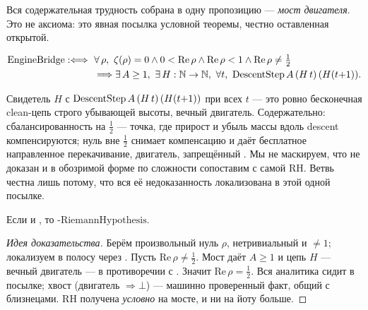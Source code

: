 Вся содержательная трудность собрана в одну пропозицию --- \emph{мост двигателя}. Это не аксиома: это
явная посылка условной теоремы, честно оставленная открытой.

\begin{definition}\label{def:EngineBridge}
\begin{equation}\label{eq:EngineBridge}
\begin{aligned}
  \mathrm{EngineBridge} :\Longleftrightarrow{}\ &\forall\,\rho,\ \zeta(\rho)=0 \wedge 0<\mathrm{Re}\,\rho \wedge \mathrm{Re}\,\rho<1 \wedge \mathrm{Re}\,\rho \ne \tfrac12\\
  &\Longrightarrow \exists\,A\ge 1,\ \exists\,H:\N\to\N,\ \forall t,\ \DescentStep A\,(H\,t)\,(H(t{+}1)).
\end{aligned}
\end{equation}
\end{definition}

Свидетель $H$ с $\operatorname{DescentStep} A\,(H\,t)\,(H(t{+}1))$ при всех $t$ --- это ровно бесконечная clean-цепь
строго убывающей высоты, вечный двигатель. Содержательно: сбалансированность на $\tfrac12$ ---
точка, где прирост и убыль массы вдоль descent компенсируются; нуль вне $\tfrac12$ снимает
компенсацию и даёт бесплатное направленное перекачивание, двигатель, запрещённый
. Мы не маскируем, что  не доказан и в обозримой форме
по сложности сопоставим с самой RH. Ветвь честна лишь потому, что вся её недоказанность локализована
в этой одной посылке.

\begin{theorem}\label{thm:riemannHypothesis_of_engine_bridge}
Если  и , то -\/$\mathrm{RiemannHypothesis}$. \green{}
\end{theorem}

\begin{proof}[Идея доказательства]
Берём произвольный нуль $\rho$, нетривиальный и $\ne 1$; локализуем в полосу через
. Пусть $\mathrm{Re}\,\rho \ne \tfrac12$. Мост даёт $A\ge1$ и цепь
$H$ --- вечный двигатель --- в противоречии с . Значит
$\mathrm{Re}\,\rho = \tfrac12$. Вся аналитика сидит в посылке; хвост (двигатель $\Rightarrow \bot$)
--- машинно проверенный факт, общий с близнецами. RH получена \emph{условно} на мосте, и ни на йоту
больше.
\end{proof}

